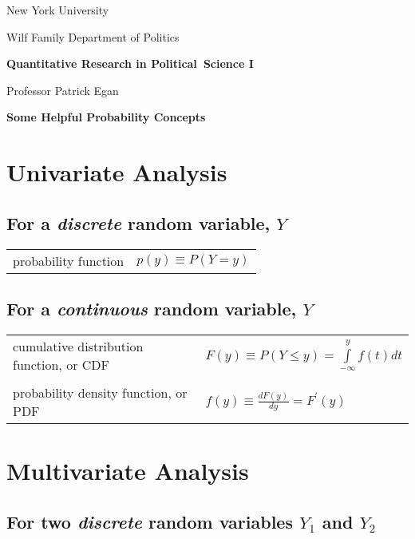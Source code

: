 \documentclass[11pt]{article}
\begin{document}
New York University

Wilf Family Department of Politics

\bigskip 

\begin{center}
{\large \textbf{Quantitative Research in Political\ Science I}}

Professor Patrick Egan

\bigskip

\textbf{Some Helpful Probability Concepts}\bigskip
\end{center}

\section{Univariate Analysis\protect\bigskip}

\subsection{For a \textit{discrete} random variable, $Y$\protect\bigskip}

\begin{tabular}{ll}
probability function & $p(y)\equiv P(Y=y)$%
\end{tabular}%
\bigskip

\subsection{For a \textit{continuous} random variable, $Y$\protect\bigskip}

\begin{tabular}{ll}
cumulative distribution function, or CDF & $F(y)\equiv P(Y\leq
y)=\int\limits_{-\infty }^{y}f(t)dt$ \\ 
&  \\ 
probability density function, or PDF & $f(y)\equiv \frac{dF(y)}{dy}%
=F^{\prime }(y)$%
\end{tabular}%
\bigskip \newpage

\section{Multivariate Analysis\protect\bigskip}

\subsection{For two \textit{discrete} random variables $Y_{1}$ and $Y_{2}$%
\protect\bigskip}
\end{document}
